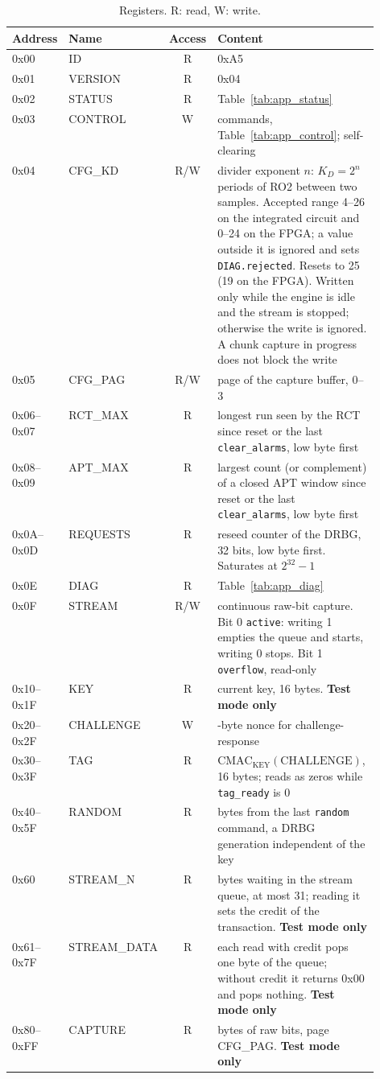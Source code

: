 \begin{table}[htbp]
\centering\small
\caption{Registers. R: read, W: write.}
\label{tab:app_regs}
\begin{tabular}{@{}llc>{\raggedright\arraybackslash}p{0.53\linewidth}@{}}
\toprule
Address & Name & Access & Content \\
\midrule
0x00 & ID & R & 0xA5 \\
0x01 & VERSION & R & 0x04 \\
0x02 & STATUS & R & Table~\ref{tab:app_status} \\
0x03 & CONTROL & W & commands, Table~\ref{tab:app_control}; self-clearing \\
0x04 & CFG\_KD & R/W & divider exponent $n$: $K_D = 2^{n}$ periods of RO2
  between two samples. Accepted range 4--26 on the integrated circuit and
  0--24 on the \ac{FPGA}; a value outside it is ignored and sets
  \texttt{DIAG.rejected}. Resets to 25 (19 on the \ac{FPGA}). Written only
  while the engine is idle and the stream is stopped; otherwise the write
  is ignored. A chunk capture in progress does not block the write \\
0x05 & CFG\_PAG & R/W & page of the capture buffer, 0--3 \\
0x06--0x07 & RCT\_MAX & R & longest run seen by the \ac{RCT} since reset
  or the last \texttt{clear\_alarms}, low byte first \\
0x08--0x09 & APT\_MAX & R & largest count (or complement) of a closed
  \ac{APT} window since reset or the last \texttt{clear\_alarms}, low
  byte first \\
0x0A--0x0D & REQUESTS & R & reseed counter of the \ac{DRBG}, 32 bits, low byte
  first. Saturates at $2^{32}-1$ \\
0x0E & DIAG & R & Table~\ref{tab:app_diag} \\
0x0F & STREAM & R/W & continuous raw-bit capture. Bit 0 \texttt{active}:
  writing 1 empties the queue and starts, writing 0 stops. Bit 1
  \texttt{overflow}, read-only \\
0x10--0x1F & KEY & R & current key, 16 bytes. \textbf{Test mode only} \\
0x20--0x2F & CHALLENGE & W & 16-byte nonce for challenge-response \\
0x30--0x3F & TAG & R & $\mathrm{CMAC}_{\text{KEY}}(\text{CHALLENGE})$, 16 bytes;
  reads as zeros while \texttt{tag\_ready} is 0 \\
0x40--0x5F & RANDOM & R & 32 bytes from the last \texttt{random} command, a
  \ac{DRBG} generation independent of the key \\
0x60 & STREAM\_N & R & bytes waiting in the stream queue, at most 31;
  reading it sets the credit of the transaction. \textbf{Test mode only} \\
0x61--0x7F & STREAM\_DATA & R & each read with credit pops one byte of the
  queue; without credit it returns 0x00 and pops nothing.
  \textbf{Test mode only} \\
0x80--0xFF & CAPTURE & R & 128 bytes of raw bits, page CFG\_PAG.
  \textbf{Test mode only} \\
\bottomrule
\end{tabular}
\end{table}

